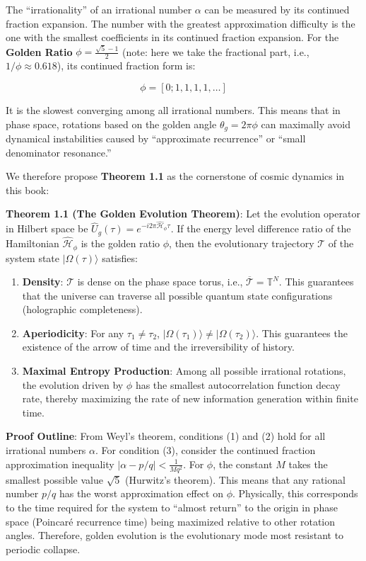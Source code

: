 The ``irrationality'' of an irrational number $\alpha$ can be measured by its continued fraction expansion. The number with the greatest approximation difficulty is the one with the smallest coefficients in its continued fraction expansion. For the \textbf{Golden Ratio} $\phi = \frac{\sqrt{5}-1}{2}$ (note: here we take the fractional part, i.e., $1/\phi \approx 0.618$), its continued fraction form is:

\[\phi = [0; 1, 1, 1, 1, \dots]\]

It is the slowest converging among all irrational numbers. This means that in phase space, rotations based on the golden angle $\theta_g = 2\pi \phi$ can maximally avoid dynamical instabilities caused by ``approximate recurrence'' or ``small denominator resonance.''

We therefore propose \textbf{Theorem 1.1} as the cornerstone of cosmic dynamics in this book:

\textbf{Theorem 1.1 (The Golden Evolution Theorem)}:
Let the evolution operator in Hilbert space be $\hat{U}_g(\tau) = e^{-i 2\pi \hat{\mathcal{H}}_\phi \tau}$. If the energy level difference ratio of the Hamiltonian $\hat{\mathcal{H}}_\phi$ is the golden ratio $\phi$, then the evolutionary trajectory $\mathcal{T}$ of the system state $|\Omega(\tau)\rangle$ satisfies:

\begin{enumerate}
\item \textbf{Density}: $\mathcal{T}$ is dense on the phase space torus, i.e., $\overline{\mathcal{T}} = \mathbb{T}^N$. This guarantees that the universe can traverse all possible quantum state configurations (holographic completeness).
\item \textbf{Aperiodicity}: For any $\tau_1 \neq \tau_2$, $|\Omega(\tau_1)\rangle \neq |\Omega(\tau_2)\rangle$. This guarantees the existence of the arrow of time and the irreversibility of history.
\item \textbf{Maximal Entropy Production}: Among all possible irrational rotations, the evolution driven by $\phi$ has the smallest autocorrelation function decay rate, thereby maximizing the rate of new information generation within finite time.
\end{enumerate}

\textbf{Proof Outline}:
From Weyl's theorem, conditions (1) and (2) hold for all irrational numbers $\alpha$. For condition (3), consider the continued fraction approximation inequality $|\alpha - p/q| < \frac{1}{M q^2}$. For $\phi$, the constant $M$ takes the smallest possible value $\sqrt{5}$ (Hurwitz's theorem). This means that any rational number $p/q$ has the worst approximation effect on $\phi$. Physically, this corresponds to the time required for the system to ``almost return'' to the origin in phase space (Poincar\'{e} recurrence time) being maximized relative to other rotation angles. Therefore, golden evolution is the evolutionary mode most resistant to periodic collapse.

